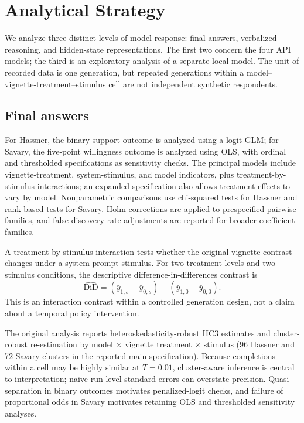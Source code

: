 \section{Analytical Strategy}

We analyze three distinct levels of model response: final answers, verbalized reasoning, and hidden-state representations. The first two concern the four API models; the third is an exploratory analysis of a separate local model. The unit of recorded data is one generation, but repeated generations within a model--vignette-treatment--stimulus cell are not independent synthetic respondents.

\subsection{Final answers}

For Hassner, the binary support outcome is analyzed using a logit GLM; for Savary, the five-point willingness outcome is analyzed using OLS, with ordinal and thresholded specifications as sensitivity checks. The principal models include vignette-treatment, system-stimulus, and model indicators, plus treatment-by-stimulus interactions; an expanded specification also allows treatment effects to vary by model. Nonparametric comparisons use chi-squared tests for Hassner and rank-based tests for Savary. Holm corrections are applied to prespecified pairwise families, and false-discovery-rate adjustments are reported for broader coefficient families.

A treatment-by-stimulus interaction tests whether the original vignette contrast changes under a system-prompt stimulus. For two treatment levels and two stimulus conditions, the descriptive difference-in-differences contrast is
\begin{equation}
\widehat{\mathrm{DiD}}=
(\bar y_{1,s}-\bar y_{0,s})-(\bar y_{1,0}-\bar y_{0,0}).
\end{equation}
This is an interaction contrast within a controlled generation design, not a claim about a temporal policy intervention.

The original analysis reports heteroskedasticity-robust HC3 estimates and cluster-robust re-estimation by model $\times$ vignette treatment $\times$ stimulus (96 Hassner and 72 Savary clusters in the reported main specification). Because completions within a cell may be highly similar at $T=0.01$, cluster-aware inference is central to interpretation; naive run-level standard errors can overstate precision. Quasi-separation in binary outcomes motivates penalized-logit checks, and failure of proportional odds in Savary motivates retaining OLS and thresholded sensitivity analyses.

